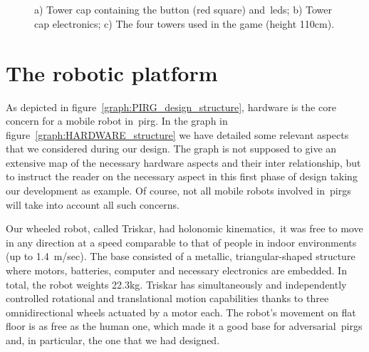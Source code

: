 \begin{figure}[h]
  \centering
  \begin{subfigure}[b]{0.3\textwidth}
  	\centering
	\caption{}
	\label{fig:tower_cap_top}
  \end{subfigure}
  ~ 
  \begin{subfigure}[b]{0.3\textwidth}
  	\centering
	\caption{}
	\label{fig:tower_electronics}
  \end{subfigure}
  ~
   \begin{subfigure}[b]{0.3\textwidth}
	  \centering
      \caption{}
    \end{subfigure}
  \caption{a) Tower cap containing the button (red square) and~\glspl{led}; b) Tower cap electronics; c) The four towers used in the game (height 110cm).}
  \label{fig:towers}
\end{figure}

\section{The robotic platform}\label{sec:roboplat} 
As depicted in figure~\ref{graph:PIRG_design_structure}, hardware is the core concern for a mobile robot in~\gls{pirg}. In the graph in figure~\ref{graph:HARDWARE_structure} we have detailed some relevant aspects that we considered during our design. The graph is not supposed to give an extensive map of the necessary hardware aspects and their inter relationship, but to instruct the reader on the necessary aspect in this first phase of design taking our development as example. Of course, not all mobile robots involved in~\glspl{pirg} will take into account all such concerns.

Our wheeled robot, called Triskar, had holonomic kinematics,~\ie it was free to move in any direction at a speed comparable to that of people in indoor environments (up to 1.4~m/sec). The base consisted of a metallic, triangular-shaped structure where motors, batteries, computer and necessary electronics are embedded. In total, the robot weights 22.3kg. Triskar has simultaneously and independently controlled rotational and translational motion capabilities thanks to three omnidirectional wheels actuated by a motor each. The robot's movement on flat floor is as free as the human one, which made it a good base for adversarial~\glspl{pirg} and, in particular, the one that we had designed. 

